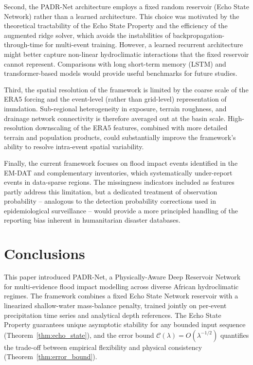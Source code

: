 \documentclass[pdflatex,sn-mathphys-ay]{sn-jnl}
\theoremstyle{thmstyleone}
\theoremstyle{thmstylethree}
\theoremstyle{thmstyletwo}
\begin{document}
Second, the PADR-Net architecture employs a fixed random reservoir
(Echo State Network) rather than a learned architecture.  This choice
was motivated by the theoretical tractability of the Echo State
Property and the efficiency of the augmented ridge solver, which
avoids the instabilities of backpropagation-through-time for
multi-event training.  However, a learned recurrent architecture
might better capture non-linear hydroclimatic interactions that the
fixed reservoir cannot represent.  Comparisons with long short-term
memory (LSTM) and transformer-based models \citep[e.g.][]{Kratzert2019}
would provide useful benchmarks for future studies.

Third, the spatial resolution of the framework is limited by the
coarse scale of the ERA5 forcing and the event-level (rather than
grid-level) representation of inundation.  Sub-regional
heterogeneity in exposure, terrain roughness, and drainage network
connectivity is therefore averaged out at the basin scale.  High-resolution
downscaling of the ERA5 features, combined with more detailed terrain
and population products, could substantially improve the framework's
ability to resolve intra-event spatial variability.

Finally, the current framework focuses on flood impact events
identified in the EM-DAT and complementary inventories, which
systematically under-report events in data-sparse regions.  The
missingness indicators included as features partly address this
limitation, but a dedicated treatment of observation probability --
analogous to the detection probability corrections used in
epidemiological surveillance -- would provide a more principled
handling of the reporting bias inherent in humanitarian disaster
databases.

\section{Conclusions}
\label{sec:conclusions}

This paper introduced PADR-Net, a Physically-Aware Deep Reservoir
Network for multi-evidence flood impact modelling across diverse
African hydroclimatic regimes.  The framework combines a fixed Echo
State Network reservoir with a linearized shallow-water mass-balance
penalty, trained jointly on per-event precipitation time series and
analytical depth references.  The Echo State Property guarantees
unique asymptotic stability for any bounded input sequence
(Theorem~\ref{thm:echo_state}), and the error bound
$\mathcal{C}(\lambda)=O(\lambda^{-1/2})$ quantifies the trade-off
between empirical flexibility and physical consistency
(Theorem~\ref{thm:error_bound}).
\end{document}
